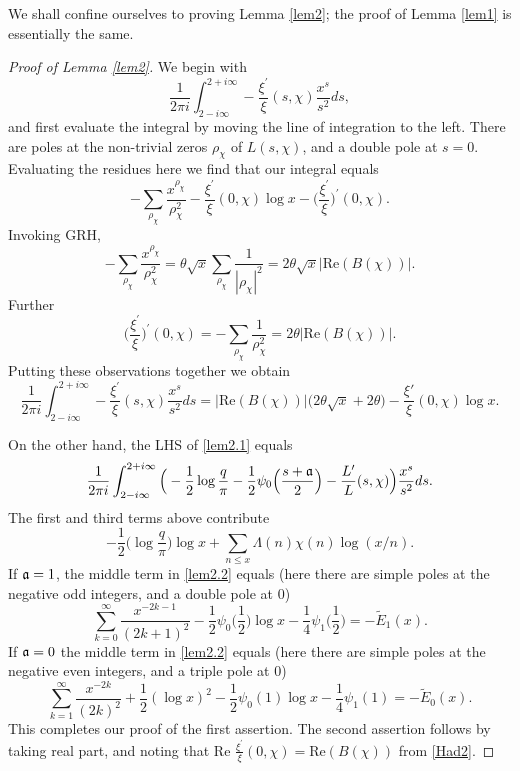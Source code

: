 \documentclass [12pt]{amsart}
\numberwithin{equation}{section}
\begin{document}
We shall confine ourselves to proving Lemma \ref{lem2}; the proof of 
Lemma \ref{lem1} is essentially the same.  

\begin{proof}[Proof of Lemma \ref{lem2}] We begin with
$$
\frac{1}{2\pi i} \int_{2-i\infty}^{2+i\infty} -\frac{\xi^{\prime}}{\xi}(s,\chi) \frac{x^s}{s^2} ds,
$$
and first evaluate the integral by moving the line of integration to the left.
There are poles at the non-trivial zeros $\rho_\chi$ of $L(s,\chi)$, and a double pole at $s=0$.
Evaluating the residues here we find that our integral equals
$$
-\sum_{\rho_\chi} \frac{x^{\rho_\chi}}{\rho_\chi^2} -  \frac{\xi^{\prime}}{\xi}(0,\chi)
\log x - \Big(\frac{\xi^{\prime}}{\xi}\Big)^{\prime}(0,\chi).
$$
Invoking GRH,
 \begin{equation*}
-\sum_{\rho_\chi} \frac{x^{\rho_\chi}}{\rho_\chi^2} = \theta \sqrt{x} \sum_{\rho_\chi}
\frac{1}{|\rho_\chi|^2} =2\theta \sqrt{x} |\text{Re} (B(\chi))|.
\end{equation*}
Further
$$
\Big(\frac{\xi^{\prime}}{\xi}\Big)^{\prime}(0,\chi) = -\sum_{\rho_\chi} \frac{1}{\rho_\chi^2} =
2\theta |\text{Re}(B(\chi))|.
$$
Putting these observations together we obtain 
\begin{equation}
\label{lem2.1}
\frac{1}{2\pi i} \int_{2-i\infty}^{2+i\infty} -\frac{\xi^{\prime}}{\xi}(s,\chi) \frac{x^s}{s^2} ds
= |\text{Re}(B(\chi))| \Big(2\theta \sqrt{x}+2\theta\Big) - \frac{\xi '}{\xi}(0, \chi) \log x.
\end{equation}

On the other hand, the LHS of \eqref{lem2.1} equals
\begin{equation}
\label{lem2.2}
\frac{1}{2\pi i} \int_{2-i\infty}^{2+i\infty}
\Big(-\frac 12 \log \frac{q}{\pi} -\frac{1}{2}\psi_0\Big(\frac{s+\frak a}{2}\Big)-\frac{L^{\prime}}{L}(s,\chi) \Big)\frac{x^s}{s^2} ds.
\end{equation}
The first and third terms above contribute
$$
-\frac 12 \Big(\log \frac q\pi \Big) \log x + \sum_{n\le x} \Lambda(n) \chi(n)
\log (x/n).
$$
If $\frak a =1$, the middle term in \eqref{lem2.2} equals (here there are simple
poles at the negative odd integers, and a double pole at $0$)
$$
\sum_{k=0}^{\infty}\frac{x^{-2k-1}}{(2k+1)^2} - \frac 12 \psi_0\Big(\frac 12\Big) \log x
- \frac 14 \psi_1\Big(\frac 12\Big) = - {\widetilde E}_1(x).
$$
If $\frak a=0$ the middle term in \eqref{lem2.2} equals (here there are
simple poles at the negative even integers, and a triple pole at $0$)
$$
\sum_{k=1}^{\infty} \frac{x^{-2k}}{(2k)^2} + \frac 12 (\log x)^2
-\frac 12\psi_0(1) \log x -\frac 14 \psi_1(1)= - {\widetilde E}_0(x).
$$
This completes our proof of the first assertion.  The second assertion follows by taking real part, and noting that $\text{Re }\frac{\xi^{\prime}}{\xi}(0,\chi) = \text{Re}(B(\chi))$ from \eqref{Had2}.
\end{proof}
\end{document}
